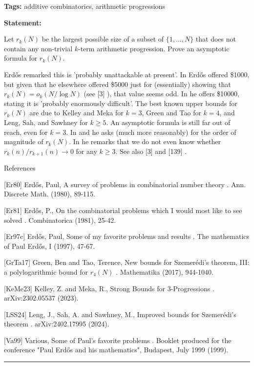 \documentclass{article}
\begin{document}
\noindent\textbf{Tags:} additive combinatorics, arithmetic progressions

\medskip

\noindent\textbf{Statement:}

Let $r_k(N)$ be the largest possible size of a subset of $\{1,\ldots,N\}$ that does not contain any non-trivial $k$-term arithmetic progression. Prove an asymptotic formula for $r_k(N)$.




Erd\H{o}s remarked this is 'probably unattackable at present'. In \cite{Er97c} Erd\H{o}s offered \$1000, but given that he elsewhere offered \$5000 just for (essentially) showing that $r_k(N)=o_k(N/\log N)$ (see [3] ), that value seems odd. In \cite{Er81} he offers \$10000, stating it is 'probably enormously difficult'. The best known upper bounds for $r_k(N)$ are due to Kelley and Meka \cite{KeMe23} for $k=3$, Green and Tao \cite{GrTa17} for $k=4$, and Leng, Sah, and Sawhney \cite{LSS24} for $k\geq 5$. An asymptotic formula is still far out of reach, even for $k=3$. In \cite{Er80} and \cite{Va99} he asks (much more reasonably) for the order of magnitude of $r_k(N)$. In \cite{Er80} he remarks that we do not even know whether $r_k(n)/r_{k+1}(n)\to 0$ for any $k\geq 3$. See also [3] and [139] .




References

[Er80] Erd\H{o}s, Paul, A survey of problems in combinatorial number theory . Ann. Discrete Math. (1980), 89-115.

[Er81] Erd\H{o}s, P., On the combinatorial problems which I would most like to see solved . Combinatorica (1981), 25-42.

[Er97c] Erd\H{o}s, Paul, Some of my favorite problems and results . The mathematics of Paul Erd\H{o}s, I (1997), 47-67.

[GrTa17] Green, Ben and Tao, Terence, New bounds for Szemer\'{e}di's theorem, III: a polylogarithmic bound for $r_4(N)$ . Mathematika (2017), 944-1040.

[KeMe23] Kelley, Z. and Meka, R., Strong Bounds for 3-Progressions . arXiv:2302.05537 (2023).

[LSS24] Leng, J., Sah, A. and Sawhney, M., Improved bounds for Szemer\'{e}di's theorem . arXiv:2402.17995 (2024).

[Va99] Various, Some of Paul's favorite problems . Booklet produced for the conference "Paul Erd\H{o}s and his mathematics", Budapest, July 1999 (1999).

\noindent\rule{\linewidth}{0.4pt}
\end{document}
